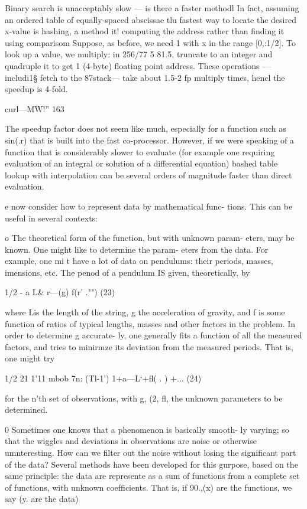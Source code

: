{{{{{{{{ 

Binary search is unacceptably slow — is there a faster methodl
In fact, assuming an ordered table of equally-spaced abscissae tlu
fastest way to locate the desired x-value is hashing, a method it!
computing the address rather than ﬁnding it using comparisom
Suppose, as before, we need 1%
with x in the range [0,:1/2]. To look up a value, we multiply: in
256/77 5 81.5, truncate to an integer and quadruple it to get 1
(4-byte) ﬂoating point address. These operations —includi1§
fetch to the 87stack— take about 1.5-2 fp multiply times, hencl
the speedup is 4-fold.

curl—MW!” 163

The speedup factor does not seem like much, especially for a
function such as sin(.r) that is built into the fast co-processor.
However, if we were speaking of a function that is considerably
slower to evaluate (for example one requiring evaluation of an
integral or solution of a differential equation) bashed table
lookup with interpolation can be several orders of magnitude
faster than direct evaluation.

e now consider how to represent data by mathematical func-
tions. This can be useful in several contexts:

o The theoretical form of the function, but with unknown param-
eters, may be known. One might like to determine the param-
eters from the data. For example, one mi t have a lot of data
on pendulums: their periods, masses, imensions, etc. The
penod of a pendulum IS given, theoretically, by

1/2
- a L&
r—(g) f(r’ ."") (23)

where Lis the length of the string, g the acceleration of gravity,
and f is some function of ratios of typical lengths, masses and
other factors in the problem. In order to determine g accurate-
ly, one generally ﬁts a function of all the measured factors, and
tries to minirmze its deviation from the measured periods.
That is, one might try

1/2
21 1'11 mbob
7n: (Tl-1') 1+a—L‘+ﬂ( . ) +... (24)

for the n'th set of observations, with g, (2, ﬂ, the unknown
parameters to be determined.

0 Sometimes one knows that a phenomenon is basically smooth-
ly varying; so that the wiggles and deviations in observations
are noise or otherwise umnteresting. How can we ﬁlter out the
noise without losing the signiﬁcant part of the data? Several
methods have been developed for this gurpose, based on the
same principle: the data are represente as a sum of functions
from a complete set of functions, with unknown coefﬁcients.
That is, if 90.,(x) are the functions, we say (y. are the data)

}}}}}}}}
